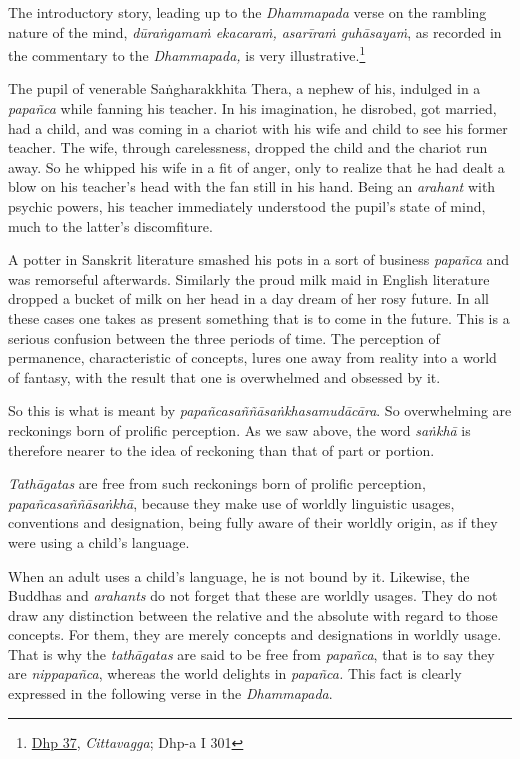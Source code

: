 The introductory story, leading up to the \emph{Dhammapada} verse on the rambling nature of the mind, \emph{dūraṅgamaṁ ekacaraṁ, asarīraṁ guhāsayaṁ}, as recorded in the commentary to the \emph{Dhammapada,} is very illustrative.\footnote{\href{https://suttacentral.net/dhp33-43/pli/ms}{Dhp 37}, \emph{Cittavagga}; Dhp-a I 301}

The pupil of venerable Saṅgharakkhita Thera, a nephew of his, indulged in a \emph{papañca} while fanning his teacher. In his imagination, he disrobed, got married, had a child, and was coming in a chariot with his wife and child to see his former teacher. The wife, through carelessness, dropped the child and the chariot run away. So he whipped his wife in a fit of anger, only to realize that he had dealt a blow on his teacher's head with the fan still in his hand. Being an \emph{arahant} with psychic powers, his teacher immediately understood the pupil's state of mind, much to the latter's discomfiture.

A potter in Sanskrit literature smashed his pots in a sort of business \emph{papañca} and was remorseful afterwards. Similarly the proud milk maid in English literature dropped a bucket of milk on her head in a day dream of her rosy future. In all these cases one takes as present something that is to come in the future. This is a serious confusion between the three periods of time. The perception of permanence, characteristic of concepts, lures one away from reality into a world of fantasy, with the result that one is overwhelmed and obsessed by it.

So this is what is meant by \emph{papañcasaññāsaṅkhasamudācāra}. So overwhelming are reckonings born of prolific perception. As we saw above, the word \emph{saṅkhā} is therefore nearer to the idea of reckoning than that of part or portion.

\emph{Tathāgatas} are free from such reckonings born of prolific perception, \emph{papañcasaññāsaṅkhā}, because they make use of worldly linguistic usages, conventions and designation, being fully aware of their worldly origin, as if they were using a child's language.

When an adult uses a child's language, he is not bound by it. Likewise, the Buddhas and \emph{arahants} do not forget that these are worldly usages. They do not draw any distinction between the relative and the absolute with regard to those concepts. For them, they are merely concepts and designations in worldly usage. That is why the \emph{tathāgatas} are said to be free from \emph{papañca}, that is to say they are \emph{nippapañca}, whereas the world delights in \emph{papañca.} This fact is clearly expressed in the following verse in the \emph{Dhammapada}.

